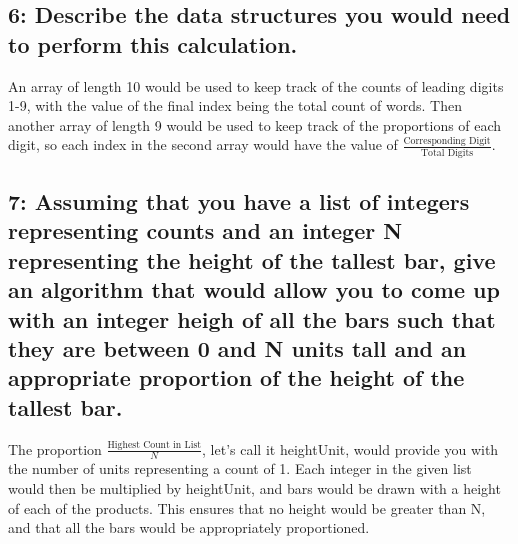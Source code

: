 \documentclass[a4paper,11pt]{article}
\theoremstyle{mytheor}
\begin{document}
\subsection*{6: Describe the data structures you would need to perform this calculation.}
An array of length 10 would be used to keep track of the counts of leading digits 1-9, with the value of the final index being the total count of words. Then another array of length 9 would be used to keep track of the proportions of each digit, so each index in the second array would have the value of $\frac{\text{Corresponding Digit}}{\text{Total Digits}}$.


\subsection*{7: Assuming that you have a list of integers representing counts and an integer N representing the height of the tallest bar, give an algorithm that would allow you to come up with an integer heigh of all the bars such that they are between 0 and N units tall and an appropriate proportion of the height of the tallest bar.}

The proportion $\frac{\text{Highest Count in List}}{N}$, let's call it heightUnit, would provide you with the number of units representing a count of 1. Each integer in the given list would then be multiplied by heightUnit, and bars would be drawn with a height of each of the products. This ensures that no height would be greater than N, and that all the bars would be appropriately proportioned.
\end{document}
